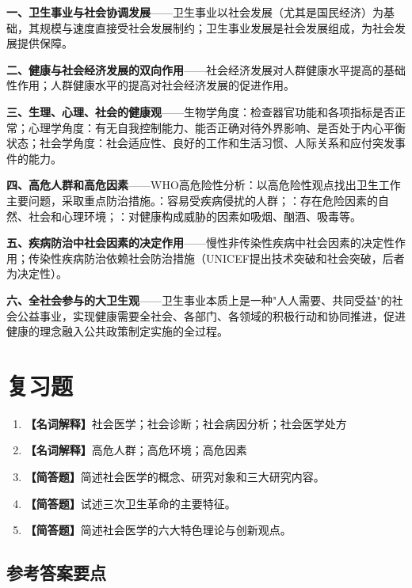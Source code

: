 \begin{keybox}
\textbf{一、卫生事业与社会协调发展}——卫生事业以社会发展（尤其是国民经济）为基础，其规模与速度直接受社会发展制约；卫生事业发展是社会发展组成，为社会发展提供保障。

\textbf{二、健康与社会经济发展的双向作用}——社会经济发展对人群健康水平提高的基础性作用；人群健康水平的提高对社会经济发展的促进作用。

\textbf{三、生理、心理、社会的健康观}——生物学角度：检查器官功能和各项指标是否正常；心理学角度：有无自我控制能力、能否正确对待外界影响、是否处于内心平衡状态；社会学角度：社会适应性、良好的工作和生活习惯、人际关系和应付突发事件的能力。

\textbf{四、高危人群和高危因素}——WHO高危险性分析：以高危险性观点找出卫生工作主要问题，采取重点防治措施。：容易受疾病侵扰的人群；：存在危险因素的自然、社会和心理环境；：对健康构成威胁的因素如吸烟、酗酒、吸毒等。

\textbf{五、疾病防治中社会因素的决定作用}——慢性非传染性疾病中社会因素的决定性作用；传染性疾病防治依赖社会防治措施（UNICEF提出技术突破和社会突破，后者为决定性）。

\textbf{六、全社会参与的大卫生观}——卫生事业本质上是一种"人人需要、共同受益"的社会公益事业，实现健康需要全社会、各部门、各领域的积极行动和协同推进，促进健康的理念融入公共政策制定实施的全过程。
\end{keybox}

\section{复习题}

\begin{enumerate}[leftmargin=*, itemsep=8pt]
    \item \textbf{【名词解释】}社会医学；社会诊断；社会病因分析；社会医学处方
    \item \textbf{【名词解释】}高危人群；高危环境；高危因素
    \item \textbf{【简答题】}简述社会医学的概念、研究对象和三大研究内容。
    \item \textbf{【简答题】}试述三次卫生革命的主要特征。
    \item \textbf{【简答题】}简述社会医学的六大特色理论与创新观点。
\end{enumerate}

\subsection*{参考答案要点}

